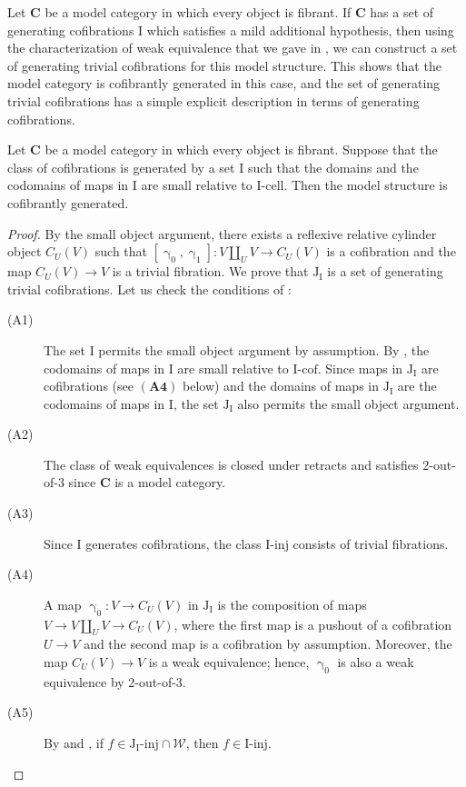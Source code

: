 \documentclass{tac}
\theoremstyle{definition}
\newcommand{\we}{\mathcal{W}}
\newcommand{\cat}[1]{\mathbf{#1}}
\newcommand{\C}{\cat{C}}
\newcommand{\I}{\mathrm{I}}
\newcommand{\J}{\mathrm{J}}
\newcommand{\class}[2]{#1\text{-}\mathrm{#2}}
\newcommand{\Iinj}[1][\I]{\class{#1}{inj}}
\newcommand{\Icell}[1][\I]{\class{#1}{cell}}
\newcommand{\Icof}[1][\I]{\class{#1}{cof}}
\newcommand{\Jinj}[1][]{\Iinj[\J#1]}
\newcommand{\cyli}{\upgamma}
\begin{document}
Let $\C$ be a model category in which every object is fibrant.
If $\C$ has a set of generating cofibrations $\I$ which satisfies a mild additional hypothesis, then using the characterization of weak equivalence that we gave in ,
we can construct a set of generating trivial cofibrations for this model structure.
This shows that the model category is cofibrantly generated in this case,
and the set of generating trivial cofibrations has a simple explicit description in terms of generating cofibrations.

\begin{prop}
Let $\C$ be a model category in which every object is fibrant.
Suppose that the class of cofibrations is generated by a set $\I$ such that
the domains and the codomains of maps in $\I$ are small relative to $\Icell$.
Then the model structure is cofibrantly generated.
\end{prop}
\begin{proof}
By the small object argument, there exists a reflexive relative cylinder object $C_U(V)$ such that $[\cyli_0,\cyli_1] : V \amalg_U V \to C_U(V)$ is a cofibration and the map $C_U(V) \to V$ is a trivial fibration.
We prove that $\J_\I$ is a set of generating trivial cofibrations.
Let us check the conditions of :
\begin{description}
\item[(A1)] The set $\I$ permits the small object argument by assumption.
By \cite[Proposition~2.1.16]{hovey}, the codomains of maps in $\I$ are small relative to $\Icof$.
Since maps in $\J_\I$ are cofibrations (see $\mathbf{(A4)}$ below) and the domains of maps in $\J_\I$ are the codomains of maps in $\I$,
the set $\J_\I$ also permits the small object argument.
\item[(A2)] The class of weak equivalences is closed under retracts and satisfies 2-out-of-3 since $\C$ is a model category.
\item[(A3)] Since $\I$ generates cofibrations, the class $\Iinj$ consists of trivial fibrations.
\item[(A4)] A map $\cyli_0 : V \to C_U(V)$ in $\J_\I$ is the composition of maps $V \to V \amalg_U V \to C_U(V)$,
where the first map is a pushout of a cofibration $U \to V$ and the second map is a cofibration by assumption.
Moreover, the map $C_U(V) \to V$ is a weak equivalence; hence, $\cyli_0$ is also a weak equivalence by 2-out-of-3.
\item[(A5)] By  and , if $f \in \Jinj[_\I] \cap \we$, then $f \in \Iinj$.
\end{description}
\end{proof}
\end{document}

